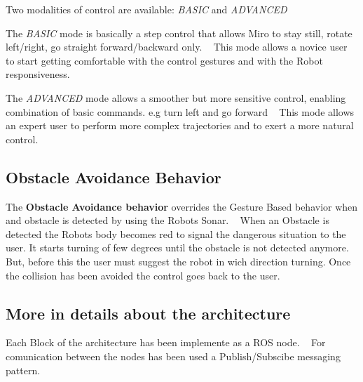  Two modalities of control are available\+: {\itshape B\+A\+S\+IC} and {\itshape A\+D\+V\+A\+N\+C\+ED} 
\begin{DoxyItemize}
\item The {\itshape B\+A\+S\+IC} mode is basically a step control that allows Miro to stay still, rotate left/right, go straight forward/backward only. ~\newline
 This mode allows a novice user to start getting comfortable with the control gestures and with the Robot responsiveness. 
\item The {\itshape A\+D\+V\+A\+N\+C\+ED} mode allows a smoother but more sensitive control, enabling combination of basic commands. e.\+g turn left and go forward ~\newline
 This mode allows an expert user to perform more complex trajectories and to exert a more natural control.
\end{DoxyItemize}\hypertarget{index_aob_sec}{}\subsection{Obstacle Avoidance Behavior}\label{index_aob_sec}
The {\bfseries{Obstacle Avoidance behavior}} overrides the Gesture Based behavior when and obstacle is detected by using the Robot\textquotesingle{}s Sonar. ~\newline
 When an Obstacle is detected the Robot\textquotesingle{}s body becomes red to signal the dangerous situation to the user. It starts turning of few degrees until the obstacle is not detected anymore. ~\newline
 But, before this the user must suggest the robot in wich direction turning. Once the collision has been avoided the control goes back to the user. \hypertarget{index_det_sec}{}\subsection{More in details about the architecture}\label{index_det_sec}
Each Block of the architecture has been implemente as a R\+OS node. ~\newline
 For comunication between the nodes has been used a Publish/\+Subscibe messaging pattern. 